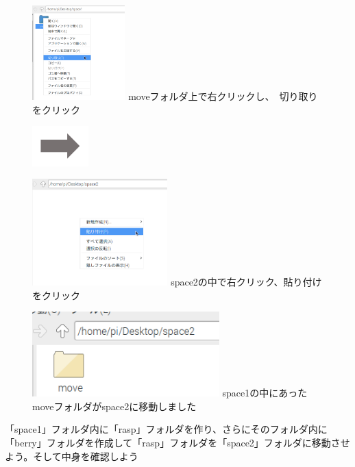\documentclass[a4paper,12pt]{jarticle}
\begin{document}
\begin{figure}[ht]
  \centering
  \begin{minipage}{6.589cm}
    \includegraphics[width=3.584cm]{textbook-img048.png}
    {
      moveフォルダ上で右クリックし、　切り取りをクリック
    }
  \end{minipage}
  \includegraphics[width=2.168cm]{textbook-img049.png}
  \begin{minipage}{6.589cm}
    \includegraphics[width=5.225cm]{textbook-img046.png}
    {
      space2の中で右クリック、貼り付けをクリック
    }
  \end{minipage}

  \begin{minipage}{6.589cm}
    \includegraphics[width=7.218cm]{textbook-img045.png}
    {
      space1の中にあったmoveフォルダがspace2に移動しました
    }
  \end{minipage}


\end{figure}


\theQuestion\label{Q:hasAnswer02-2}
「space1」フォルダ内に「rasp」フォルダを作り、さらにそのフォルダ内に「berry」フォルダを作成して「rasp」フォルダを「space2」フォルダに移動させよう。そして中身を確認しよう
\end{document}
